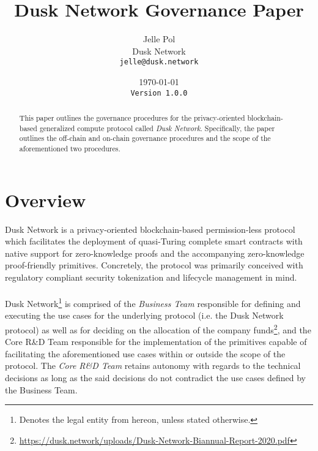 \documentclass{article}
\title{Dusk Network Governance Paper}
\author{Jelle Pol\\Dusk Network\\\texttt{jelle@dusk.network}}
\date{\today\\\texttt{Version 1.0.0}}
\begin{document}
\maketitle

\begin{abstract}
    This paper outlines the governance procedures for the privacy-oriented blockchain-based generalized compute protocol called \emph{Dusk Network}. Specifically, the paper outlines the off-chain and on-chain governance procedures and the scope of the aforementioned two procedures.
\end{abstract}

\section{Overview}
Dusk Network \cite{maharramov1} is a privacy-oriented blockchain-based permission-less protocol which facilitates the deployment of quasi-Turing complete smart contracts with native support for zero-knowledge proofs and the accompanying zero-knowledge proof-friendly primitives. Concretely, the protocol was primarily conceived with regulatory compliant security tokenization and lifecycle management in mind.\\\\
Dusk Network\footnote{Denotes the legal entity from hereon, unless stated otherwise.} is comprised of the \emph{Business Team} responsible for defining and executing the use cases for the underlying protocol (i.e. the Dusk Network protocol) as well as for deciding on the allocation of the company funds\footnote{\url{https://dusk.network/uploads/Dusk-Network-Biannual-Report-2020.pdf}}, and the Core R\&D Team responsible for the implementation of the primitives capable of facilitating the aforementioned use cases within or outside the scope of the protocol. The \emph{Core R\&D Team} retains autonomy with regards to the technical decisions as long as the said decisions do not contradict the use cases defined by the Business Team.
\end{document}
